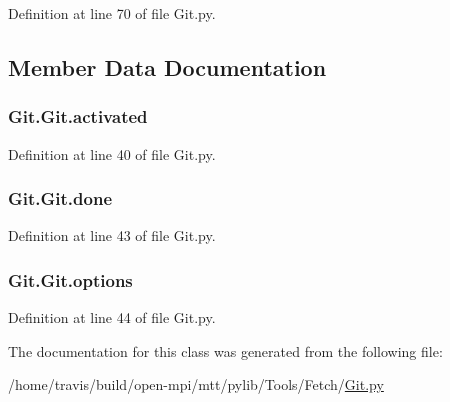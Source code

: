 Definition at line 70 of file Git.\-py.



\subsection{Member Data Documentation}
\hypertarget{class_git_1_1_git_a22d3012cb93bad0a9122dd84afdfeee9}{
\subsubsection[{activated}]{\setlength{\rightskip}{0pt plus 5cm}Git.\-Git.\-activated}}\label{class_git_1_1_git_a22d3012cb93bad0a9122dd84afdfeee9}


Definition at line 40 of file Git.\-py.

\hypertarget{class_git_1_1_git_adb8991008d4bb4568fa9c2f991711cda}{
\subsubsection[{done}]{\setlength{\rightskip}{0pt plus 5cm}Git.\-Git.\-done}}\label{class_git_1_1_git_adb8991008d4bb4568fa9c2f991711cda}


Definition at line 43 of file Git.\-py.

\hypertarget{class_git_1_1_git_a7560b88b014c5da8785739c7bb6283ed}{
\subsubsection[{options}]{\setlength{\rightskip}{0pt plus 5cm}Git.\-Git.\-options}}\label{class_git_1_1_git_a7560b88b014c5da8785739c7bb6283ed}


Definition at line 44 of file Git.\-py.



The documentation for this class was generated from the following file\-:\begin{DoxyCompactItemize}
\item 
/home/travis/build/open-\/mpi/mtt/pylib/\-Tools/\-Fetch/\hyperlink{_git_8py}{Git.\-py}\end{DoxyCompactItemize}
